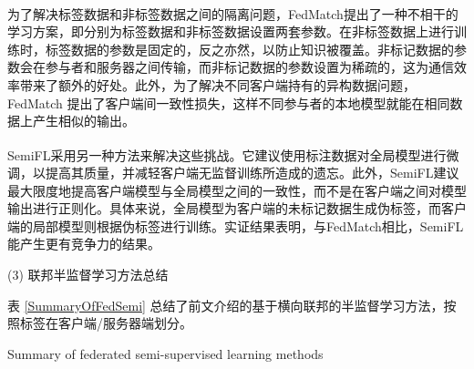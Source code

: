 为了解决标签数据和非标签数据之间的隔离问题，FedMatch\textsuperscript{\cite{jeong2020federated}}提出了一种不相干的学习方案，即分别为标签数据和非标签数据设置两套参数。在非标签数据上进行训练时，标签数据的参数是固定的，反之亦然，以防止知识被覆盖。非标记数据的参数会在参与者和服务器之间传输，而非标记数据的参数设置为稀疏的，这为通信效率带来了额外的好处。此外，为了解决不同客户端持有的异构数据问题，FedMatch 提出了客户端间一致性损失，这样不同参与者的本地模型就能在相同数据上产生相似的输出。

SemiFL\textsuperscript{\cite{diao2022semifl}}采用另一种方法来解决这些挑战。它建议使用标注数据对全局模型进行微调，以提高其质量，并减轻客户端无监督训练所造成的遗忘。此外，SemiFL建议最大限度地提高客户端模型与全局模型之间的一致性，而不是在客户端之间对模型输出进行正则化。具体来说，全局模型为客户端的未标记数据生成伪标签，而客户端的局部模型则根据伪标签进行训练。实证结果表明，与FedMatch相比，SemiFL能产生更有竞争力的结果。

(3) 联邦半监督学习方法总结

表 \ref{SummaryOfFedSemi} 总结了前文介绍的基于横向联邦的半监督学习方法，按照标签在客户端/服务器端划分。

\vspace{-0.5cm}
\begin{table}[h]
	\centering
	{\songti \wuhao Summary of federated semi-supervised learning methods}
	\label{SummaryOfFedSemi}
\end{table}

